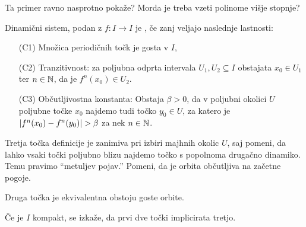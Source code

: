 \begin{opomba}
  Ta primer ravno nasprotno pokaže?
  Morda je treba vzeti polinome višje stopnje?
\end{opomba}


\begin{definicija}[Devaney]
  Dinamični sistem, podan z $f: I \to I$ je , če zanj veljajo
  naslednje lastnosti:
  \begin{enumerate}
  \item[(C1)] Množica periodičnih točk je gosta v $I$,
  \item[(C2)] Tranzitivnost: za poljubna odprta intervala $U_1, U_2 \subseteq I$
	obstajata $x_0 \in U_1$ ter $n \in \mathbb{N}$, da je $f^n(x_0) \in U_2$.
  \item[(C3)] Občutljivostna konstanta: Obstaja $\beta > 0$, da v poljubni
	okolici $U$ poljubne točke $x_0$ najdemo tudi točko $y_0 \in U$, za katero
	je $\left| f^n(x_0) - f^n(y_0) \right| > \beta$ za nek $n \in \mathbb{N}$.
  \end{enumerate}
\end{definicija}

\begin{opomba}
  Tretja točka definicije je zanimiva pri izbiri majhnih okolic $U$, saj pomeni,
  da lahko vsaki točki poljubno blizu najdemo točko s popolnoma drugačno
  dinamiko.
  Temu pravimo \enquote{metuljev pojav.}
  Pomeni, da je orbita občutljiva na začetne pogoje.
\end{opomba}

\begin{opomba}
  Druga točka je ekvivalentna obstoju goste orbite.
\end{opomba}

\begin{opomba}
  Če je $I$ kompakt, se izkaže, da prvi dve točki implicirata tretjo.
\end{opomba}


